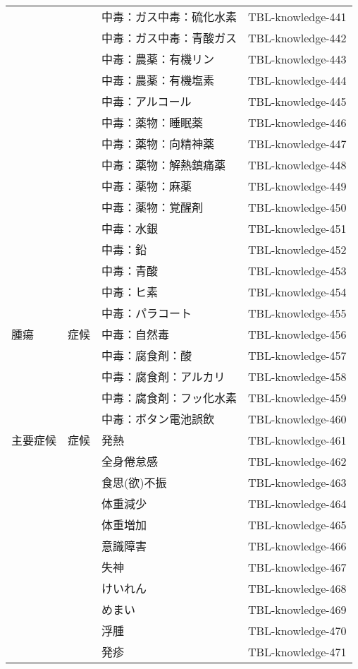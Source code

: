\begin{xltabular}{\linewidth}{XXXX}
 &  & 中毒：ガス中毒：硫化水素 & TBL-knowledge-441 \\
 &  & 中毒：ガス中毒：青酸ガス & TBL-knowledge-442 \\
 &  & 中毒：農薬：有機リン & TBL-knowledge-443 \\
 &  & 中毒：農薬：有機塩素 & TBL-knowledge-444 \\
 &  & 中毒：アルコール & TBL-knowledge-445 \\
 &  & 中毒：薬物：睡眠薬 & TBL-knowledge-446 \\
 &  & 中毒：薬物：向精神薬 & TBL-knowledge-447 \\
 &  & 中毒：薬物：解熱鎮痛薬 & TBL-knowledge-448 \\
 &  & 中毒：薬物：麻薬 & TBL-knowledge-449 \\
 &  & 中毒：薬物：覚醒剤 & TBL-knowledge-450 \\
 &  & 中毒：水銀 & TBL-knowledge-451 \\
 &  & 中毒：鉛 & TBL-knowledge-452 \\
 &  & 中毒：青酸 & TBL-knowledge-453 \\
 &  & 中毒：ヒ素 & TBL-knowledge-454 \\
 &  & 中毒：パラコート & TBL-knowledge-455 \\
腫瘍 & 症候 & 中毒：自然毒 & TBL-knowledge-456 \\
 &  & 中毒：腐食剤：酸 & TBL-knowledge-457 \\
 &  & 中毒：腐食剤：アルカリ & TBL-knowledge-458 \\
 &  & 中毒：腐食剤：フッ化水素 & TBL-knowledge-459 \\
 &  & 中毒：ボタン電池誤飲  & TBL-knowledge-460 \\
主要症候 & 症候 & 発熱 & TBL-knowledge-461 \\
 &  & 全身倦怠感 & TBL-knowledge-462 \\
 &  & 食思(欲)不振 & TBL-knowledge-463 \\
 &  & 体重減少 & TBL-knowledge-464 \\
 &  & 体重増加 & TBL-knowledge-465 \\
 &  & 意識障害 & TBL-knowledge-466 \\
 &  & 失神 & TBL-knowledge-467 \\
 &  & けいれん & TBL-knowledge-468 \\
 &  & めまい & TBL-knowledge-469 \\
 &  & 浮腫 & TBL-knowledge-470 \\
 &  & 発疹 & TBL-knowledge-471 \\

\end{xltabular}
